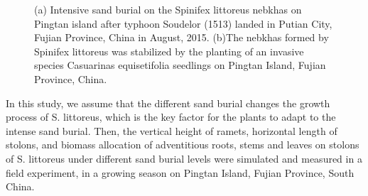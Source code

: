 \documentclass[]{interact}
\theoremstyle{plain}%
\theoremstyle{definition}
\theoremstyle{remark}
\begin{document}
\begin{figure}
  \centering
  \hspace{5pt}
  \caption{(a) Intensive sand burial on the Spinifex littoreus nebkhas on Pingtan island after typhoon Soudelor (1513) landed in Putian City, Fujian Province, China in August, 2015. (b)The nebkhas formed by Spinifex littoreus was stabilized by the planting of an invasive species Casuarinas equisetifolia seedlings on Pingtan Island, Fujian Province, China.} 
  \label{sample-pic}
\end{figure}

\label{Introduction-5}
In this study, we assume that the different sand burial changes the growth process of S. littoreus, which is the key factor for the plants to adapt to the intense sand burial. Then, the vertical height of ramets, horizontal length of stolons, and biomass allocation of adventitious roots, stems and leaves on stolons of S. littoreus under different sand burial levels were simulated and measured in a field experiment, in a growing season on Pingtan Island, Fujian Province, South China.
\end{document}
